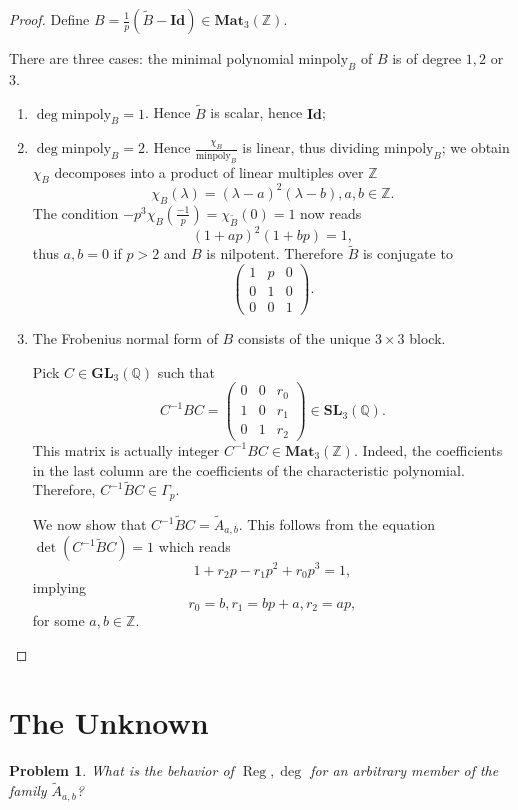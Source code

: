 \documentclass[a4paper]{article}
\newtheorem{Prob}[Thm]{Problem}
\newcommand{\Id}{\mathbf{Id}}        %
\newcommand{\GL}{\mathbf{GL}_3} %
\newcommand{\MatZ}{\mathbf{Mat}_3(\mathbb{Z})}        %
\newcommand{\SLp}{\Gamma_p}        %
\newcommand{\minpoly}{\mathrm{minpoly}}        %
\DeclareMathOperator{\Reg}{Reg}        %
\begin{document}
\begin{proof}
Define $B = \frac{1}{p}(\tilde B - \Id) \in \MatZ$.

There are three cases:
the minimal polynomial $\minpoly_B$ of $B$ is of degree $1, 2$ or $3$.
\begin{enumerate}
	\item $\deg \minpoly_B = 1$.  Hence $\tilde B$ is scalar, hence $\Id$;
	\item $\deg \minpoly_B = 2$.  Hence $ \frac{\chi_B}{\minpoly_B}$ is linear, thus dividing $\minpoly_B$; we obtain $\chi_B$ decomposes into a product of linear multiples over $ \mathbb{Z}$
	$$
	\chi_{B} (\lambda) = (\lambda - a)^2 (\lambda - b), a, b \in \mathbb{Z}.
	$$
	The condition $ - p^3 \chi_{B}( \frac{-1}{p}) = \chi_{\tilde B}(0) = 1$ now reads
	\[
	(1 + a p)^2 (1 + b p ) = 1
	,\] 
	thus $a, b = 0$ if $p > 2$ and $B$ is nilpotent.
	Therefore $\tilde B$ is conjugate to 
	\[
	\begin{pmatrix}
	1 & p & 0 \\
	0 & 1 & 0 \\
	0 & 0 & 1
	\end{pmatrix}
	.\] 
	\item
	The Frobenius normal form of 
	$B$ 
	consists of the unique $3 \times 3$ block.  

	Pick $C \in \GL( \mathbb{Q} ) $ such that 
	$$
	C^{-1} B C =
	\begin{pmatrix}
	0 & 0 & r_0 \\
	1 & 0 & r_1 \\
	0 & 1 & r_2
	\end{pmatrix} \in 
	\mathbf{SL}_3(\mathbb{Q})
	.$$ 
	This matrix is actually integer $ C^{-1} B C \in \MatZ$.
	Indeed, the coefficients in the last column are the coefficients of the characteristic polynomial. 
	Therefore, $ C^{-1} \tilde B C \in \SLp $.

	We now show that 
	$ C^{-1} \tilde B C = \tilde A_{a, b}$.
	This follows from the equation $\det (C^{-1} \tilde B C) = 1$ which reads
	\[
	1 + r_2 p - r_1 p^2 + r_0 p^3 = 1
	,\] 
	implying
	 \[
	r_0 = b, r_1 = bp + a, r_2 = ap,
	\] 
	for some $a, b \in \mathbb{Z}$.
\end{enumerate}


\end{proof}

\section{The Unknown}
\begin{Prob}
What is the behavior of $\Reg, \deg $ for an arbitrary member of the family $\tilde A_{a, b}$?
\end{Prob}
\end{document}
